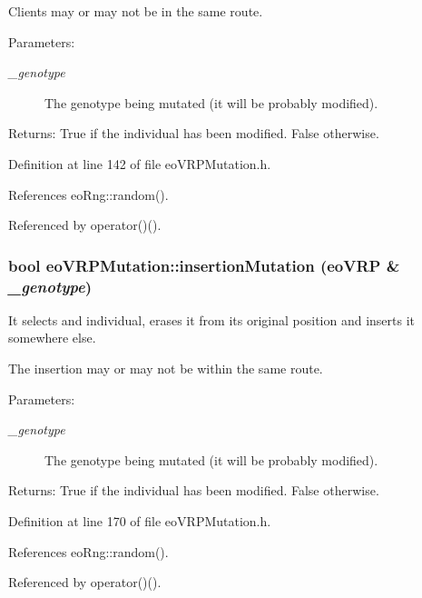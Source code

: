 Clients may or may not be in the same route. \begin{Desc}
\item[Parameters:]
\begin{description}
\item[{\em \_\-genotype}]The genotype being mutated (it will be probably modified). \end{description}
\end{Desc}
\begin{Desc}
\item[Returns:]True if the individual has been modified. False otherwise. \end{Desc}


Definition at line 142 of file eo\-VRPMutation.h.

References eo\-Rng::random().

Referenced by operator()().
\subsubsection{\setlength{\rightskip}{0pt plus 5cm}bool eo\-VRPMutation::insertion\-Mutation (\bf{eo\-VRP} \& {\em \_\-genotype})\hspace{0.3cm}{\tt  [inline, private]}}\label{classeo_v_r_p_mutation_6ead0938bb1f8ab34c321916a6dd5b66}


It selects and individual, erases it from its original position and inserts it somewhere else. 

The insertion may or may not be within the same route. \begin{Desc}
\item[Parameters:]
\begin{description}
\item[{\em \_\-genotype}]The genotype being mutated (it will be probably modified). \end{description}
\end{Desc}
\begin{Desc}
\item[Returns:]True if the individual has been modified. False otherwise. \end{Desc}


Definition at line 170 of file eo\-VRPMutation.h.

References eo\-Rng::random().

Referenced by operator()().
